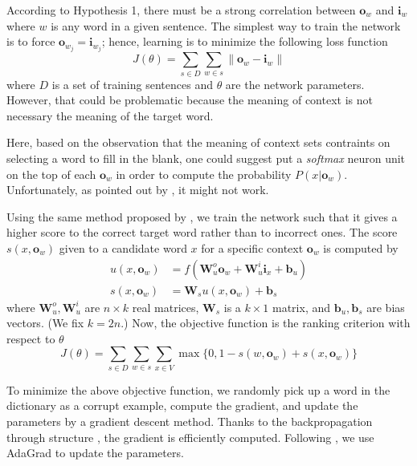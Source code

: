 \documentclass[11pt]{article}
\begin{document}
According to Hypothesis 1, there must be a strong correlation 
between $\mathbf{o}_{w}$ and $\mathbf{i}_{w}$ where $w$ is any word in 
a given sentence. The simplest way to train the network is to force 
$\mathbf{o}_{w_j} = \mathbf{i}_{w_j}$; hence, learning is to minimize the following 
loss function
\begin{equation}
	J(\theta) = \sum_{s \in D} \sum_{w \in s} \| \mathbf{o}_{w} - \mathbf{i}_{w} \|
\end{equation}
where $D$ is a set of training sentences and $\theta$ are the network parameters. 
However, that could be problematic because 
the meaning of context is not necessary the meaning of the target word.

Here, based on the observation that the meaning of context sets contraints on 
selecting a word to fill in the blank, one could suggest put a \textit{softmax} neuron 
unit on the top of each $\mathbf{o}_w$ in order to compute the probability $P(x|\mathbf{o}_w)$. 
Unfortunately, as pointed out by \cite{collobert_natural_2011}, it might not work. 

Using the same method proposed by \cite{collobert_natural_2011}, we train the network 
such that it gives a higher score to the correct target word rather than to incorrect ones. 
The score $s(x,\mathbf{o}_w)$ given to a candidate word $x$ for a specific context 
$\mathbf{o}_w$ is computed by 
\begin{align}
	u(x,\mathbf{o}_w) & = f(\mathbf{W}_u^o \mathbf{o}_w + \mathbf{W}_u^i \mathbf{i}_x + \mathbf{b}_u) \\
	s(x,\mathbf{o}_w) & = \mathbf{W}_s u(x,\mathbf{o}_w) + \mathbf{b}_s
\end{align}
where $\mathbf{W}_u^o,\mathbf{W}_u^i$ are $n \times k$ real matrices, $ \mathbf{W}_s$ is 
a $k \times 1$ matrix, and $\mathbf{b}_u, \mathbf{b}_s$ are bias vectors. (We fix $k=2n$.) 
Now, the objective function is the ranking criterion with respect to $\theta$
\begin{equation}
	J(\theta) = \sum_{s \in D} \sum_{w \in s} \sum_{x \in V} \max \{0, 1 - s(w,\mathbf{o}_w) + s(x,\mathbf{o}_w) \}
\end{equation}

To minimize the above objective function, we randomly pick up a word 
in the dictionary as a corrupt example, compute the gradient, and update 
the parameters by a gradient descent method. Thanks to the backpropagation 
through structure \cite{goller_learning_1996}, the gradient is efficiently computed. 
Following \cite{socher2013recursive}, we use AdaGrad \cite{duchi2011adaptive}
to update the parameters.
\end{document}
